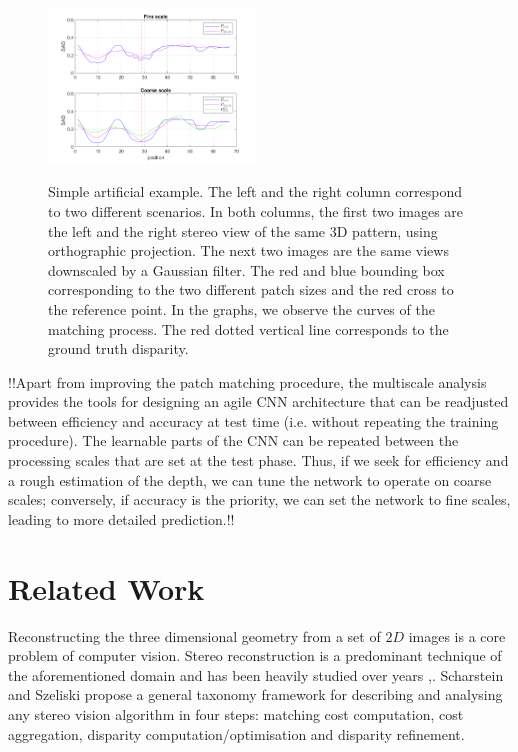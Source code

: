 \documentclass[runningheads]{llncs}
\begin{document}
\begin{figure}[!t]
\begin{center}
        \includegraphics[width=0.49\textwidth]{paper/latex/figures/low_resolution_success_graph.png}\\
        
    \end{center}
    
    \caption{Simple artificial example. The left and the right column correspond to two different scenarios. In both columns, the first two images are the left and the right stereo view of the same 3D pattern, using orthographic projection. The next two images are the same views downscaled by a Gaussian filter. The red and blue bounding box corresponding to the two different patch sizes and the red cross to the reference point. In the graphs, we observe the curves of the matching process. The red dotted vertical line corresponds to the ground truth disparity.}
    \label{fig:multiscale_importance_2D}
\end{figure}

!!Apart from improving the patch matching procedure, the multiscale analysis provides the tools for designing an agile CNN architecture that can be readjusted between efficiency and accuracy at test time (i.e. without repeating the training procedure). The learnable parts of the CNN can be repeated between the processing scales that are set at the test phase. Thus, if we seek for efficiency and a rough estimation of the depth, we can tune the network to operate on coarse scales; conversely, if accuracy is the priority, we can set the network to fine scales, leading to more detailed prediction.!!

\section{Related Work}

Reconstructing the three dimensional geometry from a set of $2D$ images is a core problem of computer vision. Stereo reconstruction is a predominant technique of the aforementioned domain and has been heavily studied over years \cite{Barnard1982ComputationalStereo},\cite{Brown2003}. Scharstein and Szeliski \cite{Scharstein2001AAlgorithms} propose a general taxonomy framework for describing and analysing any stereo vision algorithm in four steps: matching cost computation, cost aggregation, disparity computation/optimisation and disparity refinement.
\end{document}
